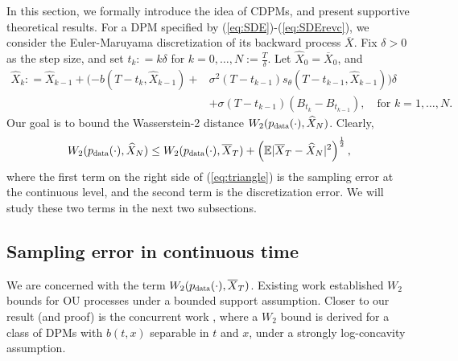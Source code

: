 \documentclass[letterpaper,10pt,reqno]{amsart}
\def\eqref#1{(\ref{#1})}
\numberwithin{equation}{section}
\begin{document}
\quad In this section,
we formally introduce the idea of CDPMs, and present supportive theoretical results.
For a DPM specified by \eqref{eq:SDE}-\eqref{eq:SDErevc},
we consider the Euler-Maruyama discretization of its backward process $\overline{X}$.
Fix $\delta > 0$ as the step size,
and set $t_k: = k \delta$ for $k = 0, \ldots, N:= \frac{T}{\delta}$.
Let $\widehat{X}_0 = \overline{X}_0$, 
and 
\begin{equation}
\label{eq:EMdisc}
\begin{aligned}
\widehat{X}_k: = \widehat{X}_{k-1} + (-b(T - t_k, \widehat{X}_{k-1}) + 
& \sigma^2(T - t_{k-1}) s_\theta(T - t_{k-1}, \widehat{X}_{k-1})) \delta \\
& + \sigma(T-t_{k-1}) (B_{t_k} - B_{t_{k-1}}), 
\quad \mbox{for } k = 1,\ldots, N.
\end{aligned}
\end{equation}
Our goal is to bound the Wasserstein-2 distance $W_2(p_{\scalebox{0.7}{data}}(\cdot), \widehat{X}_N)$.
Clearly, 
\begin{equation}
\label{eq:triangle}
W_2(p_{\scalebox{0.7}{data}}(\cdot), \widehat{X}_N)
\le W_2(p_{\scalebox{0.7}{data}}(\cdot), \overline{X}_T)
+ \left(\mathbb{E}|\overline{X}_T - \widehat{X}_N|^2\right)^{\frac{1}{2}},
\end{equation}
where the first term on the right side of \eqref{eq:triangle} is
the sampling error at the continuous level,
and the second term is the discretization error.
We will study these two terms in the next two subsections.

\subsection{Sampling error in continuous time}
\label{sc31}

We are concerned with the term $W_2(p_{\scalebox{0.7}{data}}(\cdot), \overline{X}_T)$.
Existing work \cite{Chen23, LLT23, DV21} established $W_2$ bounds 
for OU processes under a bounded support assumption.
Closer to our result (and proof) is the concurrent work \cite{GNZ23}, 
where a $W_2$ bound is derived
for a class of DPMs with $b(t,x)$ separable in $t$ and $x$,
under a strongly log-concavity assumption.
\end{document}
